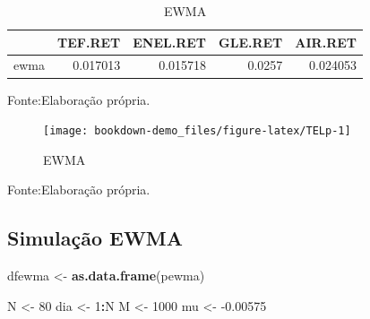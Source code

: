 \documentclass[
  12pt,
  a4paper,
  openany]{book}
\newenvironment{Shaded}{\begin{snugshade}}{\end{snugshade}}
\newcommand{\DecValTok}[1]{\textcolor[rgb]{0.00,0.00,0.81}{#1}}
\newcommand{\FloatTok}[1]{\textcolor[rgb]{0.00,0.00,0.81}{#1}}
\newcommand{\KeywordTok}[1]{\textcolor[rgb]{0.13,0.29,0.53}{\textbf{#1}}}
\newcommand{\NormalTok}[1]{#1}
\newcommand{\OperatorTok}[1]{\textcolor[rgb]{0.81,0.36,0.00}{\textbf{#1}}}
\newcommand{\StringTok}[1]{\textcolor[rgb]{0.31,0.60,0.02}{#1}}
\begin{document}
\normalsize

\begin{table}[!h]

\caption{\label{tab:unnamed-chunk-16}EWMA}
\centering
\begin{tabular}[t]{lrrrr}
\toprule
  & TEF.RET & ENEL.RET & GLE.RET & AIR.RET\\
\midrule
ewma & 0.017013 & 0.015718 & 0.0257 & 0.024053\\
\bottomrule
\end{tabular}
\end{table}
\FloatBarrier
\centering

Fonte:Elaboração própria.

\justifying
\bigskip

\begin{figure}

{\centering \texttt{[image: bookdown-demo\_files/figure-latex/TELp-1]} 

}

\caption{EWMA}\label{fig:TELp}
\end{figure}
\FloatBarrier
\centering

Fonte:Elaboração própria.

\justifying
\bigskip

\hypertarget{simulauxe7uxe3o-ewma}{%
\subsection{Simulação EWMA}\label{simulauxe7uxe3o-ewma}}

\scriptsize

\begin{Shaded}
\begin{Highlighting}[]
\NormalTok{dfewma \textless{}{-}}\StringTok{ }\KeywordTok{as.data.frame}\NormalTok{(pewma)}

\NormalTok{N \textless{}{-}}\StringTok{ }\DecValTok{80}
\NormalTok{dia \textless{}{-}}\StringTok{ }\DecValTok{1}\OperatorTok{:}\NormalTok{N}
\NormalTok{M \textless{}{-}}\StringTok{ }\DecValTok{1000}
\NormalTok{mu \textless{}{-}}\StringTok{ }\FloatTok{{-}0.00575}
\end{Highlighting}
\end{Shaded}

\normalsize

\scriptsize
\end{document}
